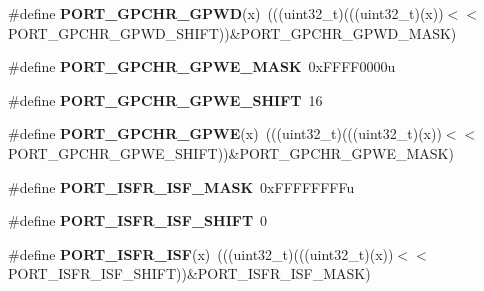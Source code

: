 \begin{DoxyCompactItemize}
\item 
\#define {\bfseries P\+O\+R\+T\+\_\+\+G\+P\+C\+H\+R\+\_\+\+G\+P\+WD}(x)~(((uint32\+\_\+t)(((uint32\+\_\+t)(x))$<$$<$P\+O\+R\+T\+\_\+\+G\+P\+C\+H\+R\+\_\+\+G\+P\+W\+D\+\_\+\+S\+H\+I\+FT))\&P\+O\+R\+T\+\_\+\+G\+P\+C\+H\+R\+\_\+\+G\+P\+W\+D\+\_\+\+M\+A\+SK)\hypertarget{group__PORT__Register__Masks_ga47cddb6551f05cf4810b6f7d96084540}{}\label{group__PORT__Register__Masks_ga47cddb6551f05cf4810b6f7d96084540}

\item 
\#define {\bfseries P\+O\+R\+T\+\_\+\+G\+P\+C\+H\+R\+\_\+\+G\+P\+W\+E\+\_\+\+M\+A\+SK}~0x\+F\+F\+F\+F0000u\hypertarget{group__PORT__Register__Masks_ga5e60b77e9d69fc09654c8034e31df7b5}{}\label{group__PORT__Register__Masks_ga5e60b77e9d69fc09654c8034e31df7b5}

\item 
\#define {\bfseries P\+O\+R\+T\+\_\+\+G\+P\+C\+H\+R\+\_\+\+G\+P\+W\+E\+\_\+\+S\+H\+I\+FT}~16\hypertarget{group__PORT__Register__Masks_gacbc69d159ff1e697736d296bbc95566d}{}\label{group__PORT__Register__Masks_gacbc69d159ff1e697736d296bbc95566d}

\item 
\#define {\bfseries P\+O\+R\+T\+\_\+\+G\+P\+C\+H\+R\+\_\+\+G\+P\+WE}(x)~(((uint32\+\_\+t)(((uint32\+\_\+t)(x))$<$$<$P\+O\+R\+T\+\_\+\+G\+P\+C\+H\+R\+\_\+\+G\+P\+W\+E\+\_\+\+S\+H\+I\+FT))\&P\+O\+R\+T\+\_\+\+G\+P\+C\+H\+R\+\_\+\+G\+P\+W\+E\+\_\+\+M\+A\+SK)\hypertarget{group__PORT__Register__Masks_gac451ecefadd3d10c690199acf0540d6f}{}\label{group__PORT__Register__Masks_gac451ecefadd3d10c690199acf0540d6f}

\item 
\#define {\bfseries P\+O\+R\+T\+\_\+\+I\+S\+F\+R\+\_\+\+I\+S\+F\+\_\+\+M\+A\+SK}~0x\+F\+F\+F\+F\+F\+F\+F\+Fu\hypertarget{group__PORT__Register__Masks_gabb5d188f3dfe38f0d8bbb870e81fb7e3}{}\label{group__PORT__Register__Masks_gabb5d188f3dfe38f0d8bbb870e81fb7e3}

\item 
\#define {\bfseries P\+O\+R\+T\+\_\+\+I\+S\+F\+R\+\_\+\+I\+S\+F\+\_\+\+S\+H\+I\+FT}~0\hypertarget{group__PORT__Register__Masks_ga678f290447622562272513d57eb2bf78}{}\label{group__PORT__Register__Masks_ga678f290447622562272513d57eb2bf78}

\item 
\#define {\bfseries P\+O\+R\+T\+\_\+\+I\+S\+F\+R\+\_\+\+I\+SF}(x)~(((uint32\+\_\+t)(((uint32\+\_\+t)(x))$<$$<$P\+O\+R\+T\+\_\+\+I\+S\+F\+R\+\_\+\+I\+S\+F\+\_\+\+S\+H\+I\+FT))\&P\+O\+R\+T\+\_\+\+I\+S\+F\+R\+\_\+\+I\+S\+F\+\_\+\+M\+A\+SK)\hypertarget{group__PORT__Register__Masks_gae1ab6f959d1aa15059efd14641caf2e7}{}\label{group__PORT__Register__Masks_gae1ab6f959d1aa15059efd14641caf2e7}


\end{DoxyCompactItemize}
